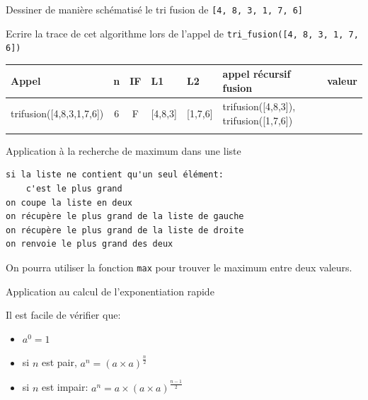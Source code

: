 \begin{exercice}{Dessiner de manière schématisé le tri fusion de \verb+[4, 8, 3, 1, 7, 6]+}{}


    \vspace{3cm}
\end{exercice}

\begin{exercice}{Ecrire la trace de cet algorithme lors de l'appel de \verb+tri_fusion([4, 8, 3, 1, 7, 6])+}{}

\begin{tabular}{|p{3.5cm}|c|c|p{}|p{}|p{6cm}|p{3cm}|}
    \hline
    Appel &n & IF & L1 & L2 & appel récursif fusion & valeur \\ \hline
    trifusion([4,8,3,1,7,6])&6&F&[4,8,3]&[1,7,6]&trifusion([4,8,3]), trifusion([1,7,6])& \\ \hline
    &&&&&& \\ \hline
    
\end{tabular}
\end{exercice}

    \begin{exercice}{Application à la recherche de maximum dans une liste}{}

        \begin{verbatim}
si la liste ne contient qu'un seul élément:
    c'est le plus grand
on coupe la liste en deux
on récupère le plus grand de la liste de gauche
on récupère le plus grand de la liste de droite
on renvoie le plus grand des deux
        \end{verbatim}
        
        On pourra utiliser la fonction \verb+max+ pour trouver le maximum entre deux valeurs.
        \end{exercice}

    \begin{exercice}{\quad }{}

        Application au calcul de l'exponentiation rapide
        
        Il est facile de vérifier que:
        
        \begin{itemize}
            \item $a^0=1$
            \item si $n$ est pair, $a^n=(a \times a)^{\frac{n}{2}}$
            \item si $n$ est impair: $a^n=a \times (a \times a)^{\frac{n-1}{2}}$
        \end{itemize}
             \end{exercice}

    \resetalltcb{}
